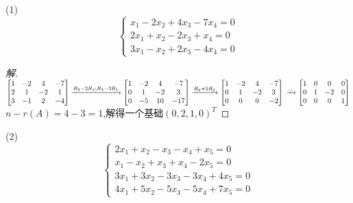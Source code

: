 \documentclass[10pt,a4paper]{report}
\begin{document}
\noindent(1)
$$
\left\{
\begin{aligned}
x_{1}-2x_{2}+4x_{3}-7x_{4}=0 \\
2x_{1}+x_{2}-2x_{3}+x_{4}=0 \\
3x_{1}-x_{2}+2x_{3}-4x_{4}=0
\end{aligned}
\right.
$$
\begin{proof}[解]
	$
	\left[
	\begin{matrix}
	1 & -2 & 4 & -7 \\
	2 & 1 & -2 & 1\\
	3 & -1 & 2 & -4
	\end{matrix}
	\right]
	\xrightarrow{R_{2}-2R_{1};R_{3}-3R_{1}}
	\left[
	\begin{matrix}
	1 & -2 & 4 & -7 \\
	0 & 1 & -2 & 3\\
	0 & -5 & 10 & -17
	\end{matrix}
	\right]
	\xrightarrow{R_{3}+5R_{2}}
	\left[
	\begin{matrix}
	1 & -2 & 4 & -7 \\
	0 & 1 & -2 & 3\\
	0 & 0 & 0 & -2
	\end{matrix}
	\right]\\
	\xrightarrow{...}
	\left[
	\begin{matrix}
	1 & 0 & 0 & 0 \\
	0 & 1 & -2 & 0\\
	0 & 0 & 0 & 1
	\end{matrix}
	\right]
	$\\
	$n-r(A) = 4-3=1$,解得一个基础$(0,2,1,0)^{T}$
\end{proof}
\noindent (2)
$$
\left\{
\begin{aligned}
2x_{1}+x_{2}-x_{3}-x_{4}+x_{5}=0 \\
x_{1}-x_{2}+x_{3}+x_{4}-2x_{5}=0 \\
3x_{1}+3x_{2}-3x_{3}-3x_{4}+4x_{5}=0 \\
4x_{1}+5x_{2}-5x_{3}-5x_{4}+7x_{5}=0
\end{aligned}
\right.
$$
\end{document}
